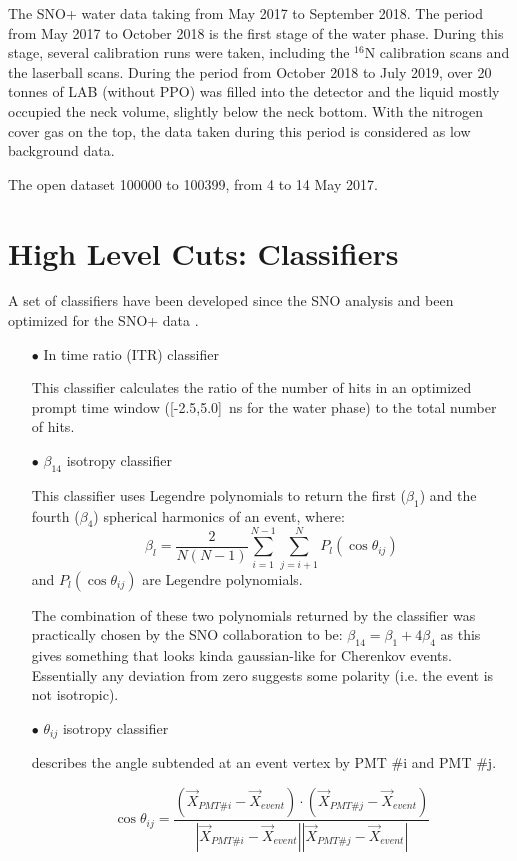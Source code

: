 
The SNO+ water data taking from May 2017 to September 2018. The period from May 2017 to October 2018 is the first stage of the water phase. During this stage, several calibration runs were taken, including the $^{16}$N calibration scans and the laserball scans. During the period from October 2018 to July 2019, over 20 tonnes of LAB (without PPO) was filled into the detector and the liquid mostly occupied the neck volume, slightly below the neck bottom. With the nitrogen cover gas on the top, the data taken during this period is considered as low background data.


The open dataset 100000 to 100399, from 4 to 14 May 2017.


\section{High Level Cuts: Classifiers}

A set of classifiers have been developed since the SNO analysis and been optimized for the SNO+ data \cite{highlevel}.


\begin{itemize}

\item[$\bullet$] In time ratio (ITR) classifier

This classifier calculates the ratio of the number of hits in an optimized prompt time window ([-2.5,5.0]~ns for the water phase) to the total number of hits.


\item[$\bullet$] $\beta_{14}$ isotropy classifier

This classifier uses Legendre polynomials to return the	first ($\beta_1$) and the fourth ($\beta_4$) spherical	harmonics of an event, where:
\[
\beta_l = \frac{2}{N(N-1)}\sum_{i=1}^{N-1}\sum_{j=i+1}^N P_l(\cos\theta_{ij})
\]
and $P_l(\cos\theta_{ij})$ are Legendre polynomials.

The	combination	of these two polynomials returned by the classifier	was	
practically	chosen by the SNO collaboration	to be: $\beta_{14}=\beta_1+4\beta_4$
as	this gives	something that looks kinda gaussian-like	for	Cherenkov	events.	
Essentially	any	deviation from zero suggests some polarity (i.e. the event is not isotropic).	


\item[$\bullet$] $\theta_{ij}$ isotropy classifier 

describes the angle subtended at an event vertex by PMT \#i and PMT \#j.

\[
\cos\theta_{ij}=\frac{(\vec{X}_{PMT\#i}- \vec{X}_{event})\cdot (\vec{X}_{PMT\#j}- \vec{X}_{event})}{|\vec{X}_{PMT\#i}- \vec{X}_{event}||\vec{X}_{PMT\#j}- \vec{X}_{event}|}
\]
\end{itemize}


